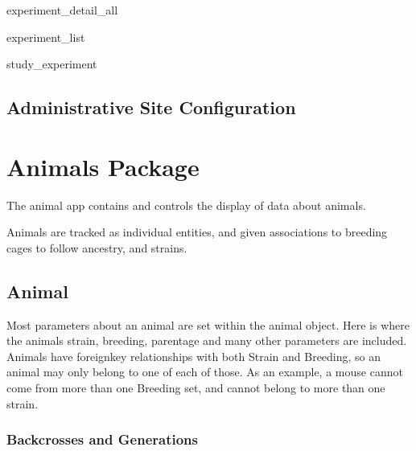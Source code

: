 \documentclass[letterpaper,10pt,english]{sphinxmanual}
\begin{document}
\hypertarget{data.views.experiment\_detail\_all}{}\begin{memberdesc}{experiment\_detail\_all}\end{memberdesc}

\hypertarget{data.views.experiment\_list}{}\begin{memberdesc}{experiment\_list}\end{memberdesc}

\hypertarget{data.views.study\_experiment}{}\begin{memberdesc}{study\_experiment}\end{memberdesc}
\hypertarget{module-data.urls}{}
\modulesynopsis{}

\subsection{Administrative Site Configuration}
\hypertarget{module-data.admin}{}
\modulesynopsis{}

\section{Animals Package}
\hypertarget{module-animal}{}
\modulesynopsis{}
The animal app contains and controls the display of data about animals.

Animals are tracked as individual entities, and given associations to breeding cages to follow ancestry, and strains.


\subsection{Animal}

Most parameters about an animal are set within the animal object.  Here is where the animals strain, breeding, parentage and many other parameters are included.  Animals have foreignkey relationships with both Strain and Breeding, so an animal may only belong to one of each of those.  As an example, a mouse cannot come from more than one Breeding set, and cannot belong to more than one strain.


\subsubsection{Backcrosses and Generations}
\end{document}
